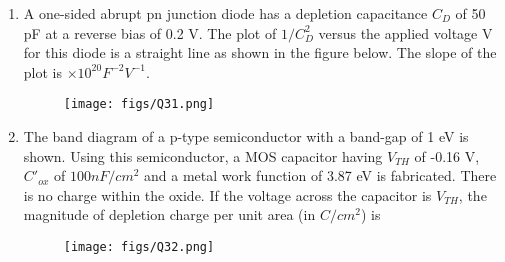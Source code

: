\documentclass[a4paper, 11pt]{article}
\begin{document}
\begin{enumerate}
    \hfill{}

    \item A one-sided abrupt pn junction diode has a depletion capacitance $C_D$ of 50 pF at a reverse bias of 0.2 V. The plot of $1/C_D^2$ versus the applied voltage V for this diode is a straight line as shown in the figure below. The slope of the plot is \underline{\hspace{2cm}} $\times 10^{20} F^{-2}V^{-1}$.
    \begin{figure}[H]
        \centering
        \texttt{[image: figs/Q31.png]}
        \caption*{}
        \label{fig:q41}
    \end{figure}
    \begin{enumerate}
    \end{enumerate}

    \hfill{}

    \item The band diagram of a p-type semiconductor with a band-gap of 1 eV is shown. Using this semiconductor, a MOS capacitor having $V_{TH}$ of -0.16 V, $C'_{ox}$ of $100 nF/cm^2$ and a metal work function of 3.87 eV is fabricated. There is no charge within the oxide. If the voltage across the capacitor is $V_{TH}$, the magnitude of depletion charge per unit area (in $C/cm^2$) is
    \begin{figure}[H]
        \centering
        \texttt{[image: figs/Q32.png]}
        \caption*{}
        \label{fig:q42}
    \end{figure}
    \begin{enumerate}
    \end{enumerate}
    

\end{enumerate}
\end{document}

